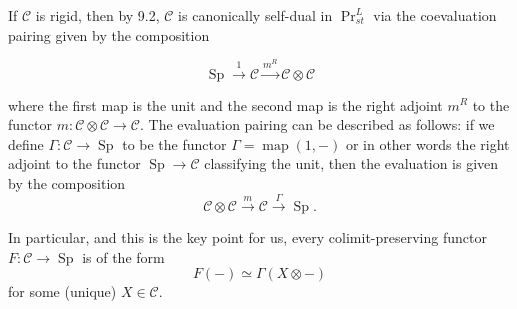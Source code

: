 \documentclass[12pt]{article}
\newcommand{\on}{\operatorname}
\newcommand{\mc}{\mathcal}
\begin{document}
If $\mathcal{C}$ is rigid, then by \cite{GaitsgoryDerivedI} 9.2, $\mathcal{C}$ is canonically self-dual in $\on{Pr}_{st}^L$ via the coevaluation pairing given by the composition

$$\on{Sp} \overset{1}{\rightarrow} \mathcal{C} \overset{m^R}{\rightarrow} \mathcal{C}\otimes \mathcal{C}$$

\noindent where the first map is the unit and the second map is the right adjoint $m^R$ to the functor $m:\mathcal{C}\otimes\mathcal{C}\to\mathcal{C}$.  The evaluation pairing can be described as follows: if we define $\Gamma:\mathcal{C}\to\on{Sp}$ to be the functor $\Gamma = \on{map}(1,-)$ or in other words the right adjoint to the functor $\on{Sp}\to\mathcal{C}$ classifying the unit, then the evaluation is given by the composition
$$\mathcal{C}\otimes\mathcal{C}\overset{m}{\rightarrow}\mathcal{C}\overset{\Gamma}{\rightarrow}\on{Sp}.$$

\label{keypointrigid} In particular, and this is the key point for us, every colimit-preserving functor $F:\mathcal{C}\to\on{Sp}$ is of the form
$$F(-) \simeq \Gamma(X\otimes -)$$
for some (unique) $X\in\mc{C}$.
\end{document}
